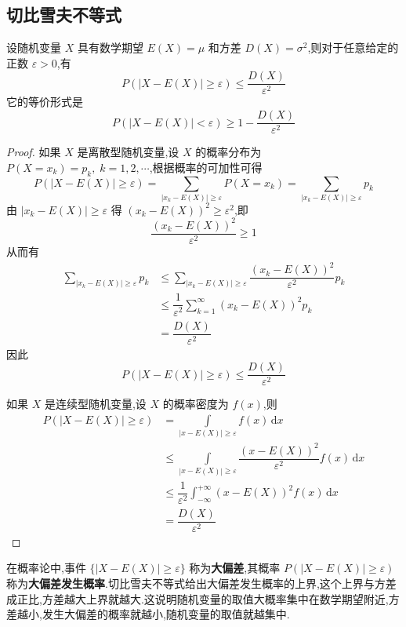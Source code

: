\subsection{切比雪夫不等式}

\begin{theorem}[][切比雪夫不等式]
    \indent 设随机变量 $X$ 具有数学期望 $E(X)=\mu$ 和方差 $D(X) = \sigma^2$,则对于任意给定的正数 $\varepsilon > 0$,有
    $$
    P(|X-E(X)| \geqslant \varepsilon) \leqslant \dfrac{D(X)}{\varepsilon^2}
    $$
    它的等价形式是
    $$
    P(|X-E(X)| < \varepsilon) \geqslant 1 - \dfrac{D(X)}{\varepsilon^2}
    $$
\end{theorem}

\begin{proof}
    如果 $X$ 是离散型随机变量,设 $X$ 的概率分布为 $P(X = x_k) = p_k, \; k=1,2,\cdots$,根据概率的可加性可得
    $$
    P(|X-E(X)| \geqslant \varepsilon) = \sum_{|x_k-E(X)| \geqslant \varepsilon} P(X=x_k) = \sum_{|x_k-E(X)| \geqslant \varepsilon} p_k
    $$
    由 $|x_k-E(X)| \geqslant \varepsilon$ 得 $(x_k-E(X))^2 \geqslant \varepsilon^2$,即
    $$
    \dfrac{(x_k-E(X))^2}{\varepsilon^2} \geqslant 1
    $$
    从而有
    $$
    \begin{aligned}
        \sum_{|x_k-E(X)| \geqslant \varepsilon} p_k & \leqslant \sum_{|x_k-E(X)| \geqslant \varepsilon} \dfrac{(x_k-E(X))^2}{\varepsilon^2} p_k \\
        & \leqslant \dfrac{1}{\varepsilon^2} \sum_{k=1}^{\infty} (x_k-E(X))^2 p_k \\
        &= \dfrac{D(X)}{\varepsilon^2}
    \end{aligned}
    $$
    因此
    $$
    P(|X-E(X)| \geqslant \varepsilon) \leqslant \dfrac{D(X)}{\varepsilon^2}
    $$

    如果 $X$ 是连续型随机变量,设 $X$ 的概率密度为 $f(x)$,则
    $$
    \begin{aligned}
        P(|X-E(X)| \geqslant \varepsilon) &= \underset{|x-E(X)| \geqslant \varepsilon}{\int} f(x) \, \text{d}x \\
         & \leqslant \underset{|x-E(X)| \geqslant \varepsilon}{\int} \dfrac{(x-E(X))^2}{\varepsilon^2} f(x) \, \text{d}x \\
         & \leqslant \dfrac{1}{\varepsilon^2} \int_{-\infty}^{+\infty} (x-E(X))^2 f(x) \, \text{d}x \\
         &= \dfrac{D(X)}{\varepsilon^2}
    \end{aligned}
    $$
\end{proof}

在概率论中,事件 $\{ |X-E(X)| \geqslant \varepsilon \}$ 称为\textbf{大偏差},其概率 $P(|X-E(X)| \geqslant \varepsilon)$ 称为\textbf{大偏差发生概率}.切比雪夫不等式给出大偏差发生概率的上界,这个上界与方差成正比,方差越大上界就越大.这说明随机变量的取值大概率集中在数学期望附近,方差越小,发生大偏差的概率就越小,随机变量的取值就越集中.

